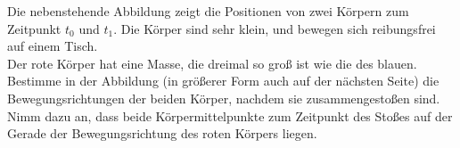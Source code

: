 \begin{minipage}[b]{0.6\textwidth}
\begin{Exercise}[label = col1, title = Stoßaufnahme, origin = Aaron Wild, difficulty = 5]
Die nebenstehende Abbildung zeigt die Positionen von zwei Körpern zum Zeitpunkt $t_0$ und $t_1$. Die Körper sind sehr klein, und bewegen sich reibungsfrei auf einem Tisch.\\
Der rote Körper hat eine Masse, die dreimal so groß ist wie die des blauen.\\
Bestimme in der Abbildung (in größerer Form auch auf der nächsten Seite) die Bewegungsrichtungen der beiden Körper, nachdem sie zusammengestoßen sind. Nimm dazu an, dass beide Körpermittelpunkte zum Zeitpunkt des Stoßes auf der Gerade der Bewegungsrichtung des roten Körpers liegen.
\end{Exercise}
\end{minipage}
\begin{minipage}[b]{0.4\textwidth}
	\flushright
	
\end{minipage}